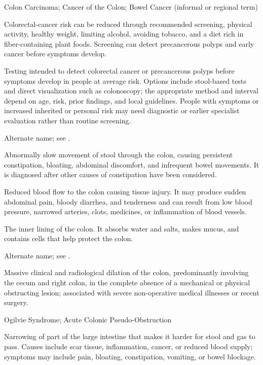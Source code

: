 \synonyms
Colon Carcinoma; Cancer of the Colon; Bowel Cancer (informal or regional term)

 Colorectal-cancer risk can be reduced through recommended screening, physical activity, healthy weight, limiting alcohol, avoiding tobacco, and a diet rich in fiber-containing plant foods. Screening can detect precancerous polyps and early cancer before symptoms develop.

 Testing intended to detect colorectal cancer or precancerous polyps before symptoms develop in people at average risk. Options include stool-based tests and direct visualization such as colonoscopy; the appropriate method and interval depend on age, risk, prior findings, and local guidelines. People with symptoms or increased inherited or personal risk may need diagnostic or earlier specialist evaluation rather than routine screening.

 Alternate name; see .

 Abnormally slow movement of stool through the colon, causing persistent constipation, bloating, abdominal discomfort, and infrequent bowel movements. It is diagnosed after other causes of constipation have been considered.

 Reduced blood flow to the colon causing tissue injury. It may produce sudden abdominal pain, bloody diarrhea, and tenderness and can result from low blood pressure, narrowed arteries, clots, medicines, or inflammation of blood vessels.

 The inner lining of the colon. It absorbs water and salts, makes mucus, and contains cells that help protect the colon.

 Alternate name; see .

 Massive clinical and radiological dilation of the colon, predominantly involving the cecum and right colon, in the complete absence of a mechanical or physical obstructing lesion; associated with severe non-operative medical illnesses or recent surgery.

\synonyms
Ogilvie Syndrome; Acute Colonic Pseudo-Obstruction

 Narrowing of part of the large intestine that makes it harder for stool and gas to pass. Causes include scar tissue, inflammation, cancer, or reduced blood supply; symptoms may include pain, bloating, constipation, vomiting, or bowel blockage.

